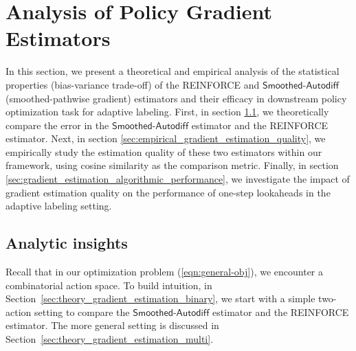 
\newcommand{\cosim}{\mathsf{cosim}}




\section{Analysis of Policy Gradient Estimators}
\label{sec:gradient_estimation_anlaysis}

In this section, we present a theoretical and empirical analysis of the statistical properties (bias-variance trade-off) of the \textsf{REINFORCE} and  $\mathsf{Smoothed\text{-}Autodiff}$ (smoothed-pathwise gradient) estimators and their efficacy
in downstream policy optimization task for adaptive labeling. First, in section \ref{sec:theory_gradient_estimation}, we theoretically compare the error in the $\mathsf{Smoothed\text{-}Autodiff}$ estimator and the \textsf{REINFORCE} estimator.
Next, in section \ref{sec:empirical_gradient_estimation_quality}, we empirically study the estimation quality of these two estimators within our framework, using  cosine similarity as the comparison metric. Finally, in section \ref{sec:gradient_estimation_algorithmic_performance}, we investigate the impact of gradient estimation quality on the performance of one-step lookaheads in the adaptive labeling setting.




\subsection{Analytic insights}
\label{sec:theory_gradient_estimation}

 Recall that in our optimization problem (\ref{eqn:general-obj}), we encounter a combinatorial action space.
To build intuition, in Section~\ref{sec:theory_gradient_estimation_binary},   we start with a simple two-action setting to compare the 
$\mathsf{Smoothed\text{-}Autodiff}$ estimator and the \textsf{REINFORCE} estimator. 
The more  general setting is discussed in Section~\ref{sec:theory_gradient_estimation_multi}. 


